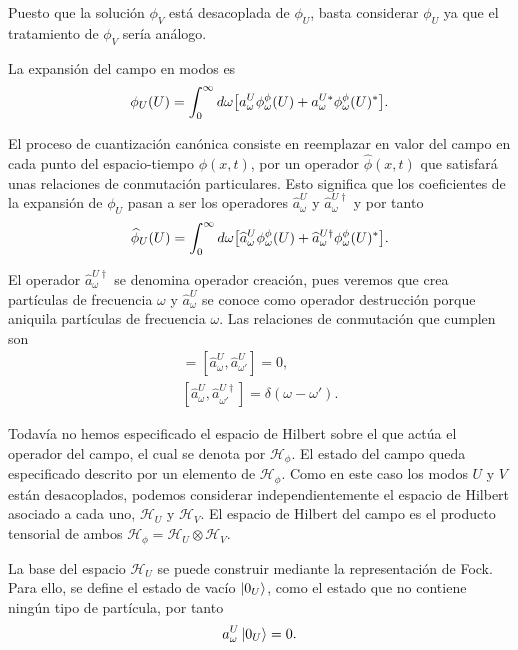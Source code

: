 Puesto que la solución $\phi_V$ está desacoplada de $\phi_U$, basta considerar $\phi_U$ ya que
el tratamiento de $\phi_V$ sería análogo.

La expansión del campo en modos es
\begin{equation}
\phi_U(U) = \int_0^\infty d\omega \qty[a_\omega^U \phi_\omega^\phi (U)+a_\omega^{U*} \phi_\omega^\phi (U)^*].
\end{equation}

El proceso de cuantización canónica consiste en reemplazar en valor del campo en cada
punto del espacio-tiempo $\phi(x,t)$, por un operador $\widehat \phi(x,t)$ que satisfará unas
relaciones de conmutación particulares. 
Esto significa que los coeficientes de la expansión de $\phi_U$ pasan a ser los operadores
$\widehat a_\omega^U$ y $\widehat a_\omega^{U\dagger}$ y por tanto
\begin{equation}
  \widehat \phi_U(U) = \int_0^\infty d\omega \qty[\widehat a_\omega^U\phi_\omega^\phi (U)+\widehat a_\omega^{U\dagger} \phi_\omega^\phi (U)^*].
\end{equation}

El operador $\widehat a_\omega^{U\dagger}$ se denomina operador creación, pues veremos que crea 
partículas de frecuencia $\omega$ y $\widehat a_\omega^U$ se conoce como operador destrucción porque
aniquila partículas de frecuencia $\omega$.
Las relaciones de conmutación que cumplen son
\begin{gather}
  [\widehat a_\omega^{U\dagger},\widehat a_{\omega'}^{U\dagger}]=[\widehat a_\omega^U,\widehat a_{\omega'}^U]=0, \\
  [\widehat a_\omega^U,\widehat a_{\omega'}^{U\dagger}]=\delta(\omega-\omega').
\end{gather}

Todavía no hemos especificado el espacio de Hilbert sobre el que actúa el operador del campo, el cual
se denota por $\mathcal H_\phi$. 
El estado del campo queda especificado descrito por un elemento de $\mathcal H_\phi$.
Como en este caso los modos $U$ y $V$ están desacoplados, podemos considerar independientemente el espacio
de Hilbert asociado a cada uno, $\mathcal H_U$ y $\mathcal H_V$.
El espacio de Hilbert del campo es el producto tensorial de ambos $\mathcal H_\phi=\mathcal H_U\otimes \mathcal H_V$.

La base del espacio $\mathcal H_U$ se puede construir mediante la representación de Fock. 
Para ello, se define el estado de vacío $\ket{0_U}$, como el estado que no contiene ningún tipo
de partícula, por tanto
\begin{equation}
  a^U_\omega \ket{0_U} = 0.
\end{equation}

